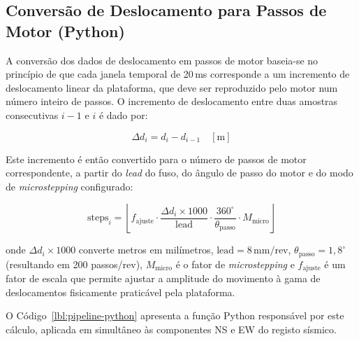 \subsection{Conversão de Deslocamento para Passos de Motor (Python)}
\label{subsec:conversao-python}

A conversão dos dados de deslocamento em passos de motor baseia-se no princípio de que cada janela temporal de 20\,ms corresponde a um incremento de deslocamento linear da plataforma, que deve ser reproduzido pelo motor num número inteiro de passos. O incremento de deslocamento entre duas amostras consecutivas $i-1$ e $i$ é dado por:

\begin{equation}
\Delta d_i = d_i - d_{i-1} \quad [\text{m}]
\label{eq:delta-deslocamento}
\end{equation}

Este incremento é então convertido para o número de passos de motor correspondente, a partir do \textit{lead} do fuso, do ângulo de passo do motor e do modo de \textit{microstepping} configurado:

\begin{equation}
\text{steps}_i = \left\lfloor f_{\text{ajuste}} \cdot \frac{\Delta d_i \times 1000}{\text{lead}} \cdot \frac{360^\circ}{\theta_{\text{passo}}} \cdot M_{\text{micro}} \right\rfloor
\label{eq:steps}
\end{equation}

onde $\Delta d_i \times 1000$ converte metros em milímetros, $\text{lead} = 8\,\text{mm/rev}$, $\theta_{\text{passo}} = 1{,}8^\circ$ (resultando em 200 passos/rev), $M_{\text{micro}}$ é o fator de \textit{microstepping} e $f_{\text{ajuste}}$ é um fator de escala que permite ajustar a amplitude do movimento à gama de deslocamentos fisicamente praticável pela plataforma.

O Código~\ref{lbl:pipeline-python} apresenta a função Python responsável por este cálculo, aplicada em simultâneo às componentes NS e EW do registo sísmico.

